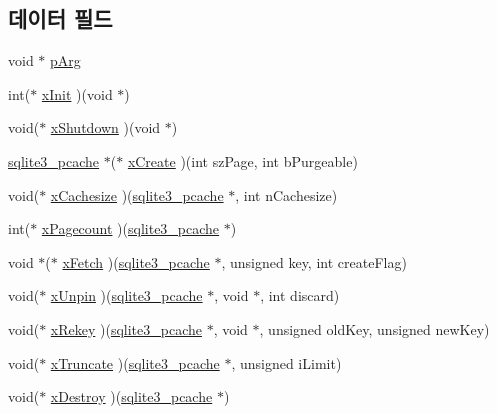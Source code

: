 \subsection*{데이터 필드}
\begin{DoxyCompactItemize}
\item 
void $\ast$ \hyperlink{structsqlite3__pcache__methods_ac71a23fce5a94ac9bc6babdbbaf1b5b4}{p\+Arg}
\item 
int($\ast$ \hyperlink{structsqlite3__pcache__methods_ac75d3dbf840e6f05ea08d35ad0457fb2}{x\+Init} )(void $\ast$)
\item 
void($\ast$ \hyperlink{structsqlite3__pcache__methods_aa2835c25fac454b7ee7cfd9e625700d7}{x\+Shutdown} )(void $\ast$)
\item 
\hyperlink{sqlite3_8h_a096c453d937d51f7926d7d31c8e0bd2f}{sqlite3\+\_\+pcache} $\ast$($\ast$ \hyperlink{structsqlite3__pcache__methods_ac903d0438a7a1554c818b4c17585e790}{x\+Create} )(int sz\+Page, int b\+Purgeable)
\item 
void($\ast$ \hyperlink{structsqlite3__pcache__methods_ac9ccbed1bea2a902906bfeaa6a330b40}{x\+Cachesize} )(\hyperlink{sqlite3_8h_a096c453d937d51f7926d7d31c8e0bd2f}{sqlite3\+\_\+pcache} $\ast$, int n\+Cachesize)
\item 
int($\ast$ \hyperlink{structsqlite3__pcache__methods_a1e0895008a701c1843336f0e0dcd3f46}{x\+Pagecount} )(\hyperlink{sqlite3_8h_a096c453d937d51f7926d7d31c8e0bd2f}{sqlite3\+\_\+pcache} $\ast$)
\item 
void $\ast$($\ast$ \hyperlink{structsqlite3__pcache__methods_ae09b8ed29c2dd77157f26a69255fd482}{x\+Fetch} )(\hyperlink{sqlite3_8h_a096c453d937d51f7926d7d31c8e0bd2f}{sqlite3\+\_\+pcache} $\ast$, unsigned key, int create\+Flag)
\item 
void($\ast$ \hyperlink{structsqlite3__pcache__methods_a2aa1aefc301a0fe4998ed8397b028630}{x\+Unpin} )(\hyperlink{sqlite3_8h_a096c453d937d51f7926d7d31c8e0bd2f}{sqlite3\+\_\+pcache} $\ast$, void $\ast$, int discard)
\item 
void($\ast$ \hyperlink{structsqlite3__pcache__methods_a0d8a7a980e22e908429a181f8fc7733e}{x\+Rekey} )(\hyperlink{sqlite3_8h_a096c453d937d51f7926d7d31c8e0bd2f}{sqlite3\+\_\+pcache} $\ast$, void $\ast$, unsigned old\+Key, unsigned new\+Key)
\item 
void($\ast$ \hyperlink{structsqlite3__pcache__methods_adc097defb1e83c6442fc0d47ac79cec9}{x\+Truncate} )(\hyperlink{sqlite3_8h_a096c453d937d51f7926d7d31c8e0bd2f}{sqlite3\+\_\+pcache} $\ast$, unsigned i\+Limit)
\item 
void($\ast$ \hyperlink{structsqlite3__pcache__methods_ac775533f86db1d15bf7e4ded0e037eaf}{x\+Destroy} )(\hyperlink{sqlite3_8h_a096c453d937d51f7926d7d31c8e0bd2f}{sqlite3\+\_\+pcache} $\ast$)
\end{DoxyCompactItemize}


